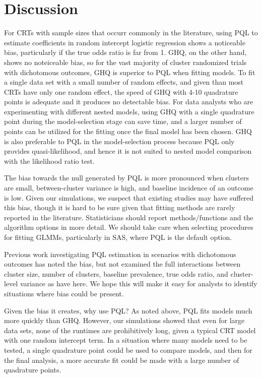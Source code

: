 \documentclass[Afour,times,sagev,doublespace]{sagej}
\begin{document}
\section{Discussion}

For CRTs with sample sizes that occurr commonly in the literature, using PQL to estimate coefficients in random intercept logistic regression shows a noticeable bias, particularly if the true odds ratio is far from 1. GHQ, on the other hand, shows no noteiceable bias, so for the vast majority of cluster randomized trials with dichotomous outcomes, GHQ is superior to PQL when fitting models. To fit a single data set with a small number of random effects, and given than most CRTs have only one random effect, the speed of GHQ with 4-10 quadrature points is adequate and it produces no detectable bias. For data analysts who are experimenting with different nested models, using GHQ with a single quadrature point during the model-selection stage can save time, and a larger number of points can be utilized for the fitting once the final model has been chosen. GHQ is also preferable to PQL in the model-selection process because PQL only provides quasi-likelihood, and hence it is not suited to nested model comparison with the likelihood ratio test.

The bias towards the null generated by PQL is more pronounced when clusters are small, between-cluster variance is high, and baseline incidence of an outcome is low. Given our simulations, we suspect that existing studies may have suffered this bias, though it is hard to be sure given that fitting methods are rarely reported in the literature. Statisticians should report methods/functions and the algorithm options in more detail.  We should take care when selecting procedures for fitting GLMMs, particularly in SAS, where PQL is the default option.

Previous work investigating PQL estimation in scenarios with dichotomous outcomes has noted the bias\cite{jang_numerical_2009,zhang_fitting_2011}, but not examined the full interactions between cluster size, number of clusters, baseline prevalence, true odds ratio, and cluster-level variance as have here. We hope this will make it easy for analysts to identify situations where bias could be present.

Given the bias it creates, why use PQL? As noted above, PQL fits models much more quickly than GHQ. However, our simulations showed that even for large data sets, none of the runtimes are prohibitively long, given a typical CRT model with one random intercept term. In a situation where many models need to be tested, a single quadrature point could be used to compare models, and then for the final analysis, a more accurate fit could be made with a large number of quadrature points.
\end{document}
